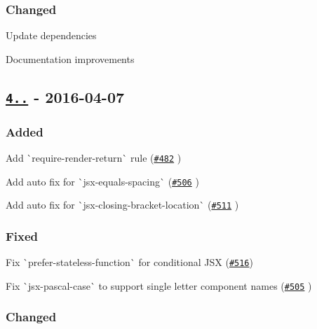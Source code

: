 \subsubsection*{Changed}


\begin{DoxyItemize}
\item Update dependencies
\item Documentation improvements
\end{DoxyItemize}

\subsection*{\href{https://github.com/yannickcr/eslint-plugin-react/compare/v4.2.3...v4.3.0}{\tt 4..} -\/ 2016-\/04-\/07}

\subsubsection*{Added}


\begin{DoxyItemize}
\item Add \`{}require-\/render-\/return\`{} rule (\href{https://github.com/yannickcr/eslint-plugin-react/issues/482}{\tt \#482} )
\item Add auto fix for \`{}jsx-\/equals-\/spacing\`{} (\href{https://github.com/yannickcr/eslint-plugin-react/pull/506}{\tt \#506} )
\item Add auto fix for \`{}jsx-\/closing-\/bracket-\/location\`{} (\href{https://github.com/yannickcr/eslint-plugin-react/pull/511}{\tt \#511} )
\end{DoxyItemize}

\subsubsection*{Fixed}


\begin{DoxyItemize}
\item Fix \`{}prefer-\/stateless-\/function\`{} for conditional J\+SX (\href{https://github.com/yannickcr/eslint-plugin-react/issues/516}{\tt \#516})
\item Fix \`{}jsx-\/pascal-\/case\`{} to support single letter component names (\href{https://github.com/yannickcr/eslint-plugin-react/issues/505}{\tt \#505} )
\end{DoxyItemize}

\subsubsection*{Changed}


